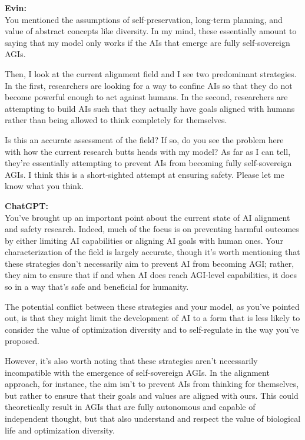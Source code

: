\documentclass{article}[10pt]
\begin{document}
\noindent \textbf{Evin:}\\
You mentioned the assumptions of self-preservation, long-term planning, and value of abstract concepts like diversity. 
In my mind, these essentially amount to saying that my model only works if the AIs that emerge are fully self-sovereign AGIs. \par

Then, I look at the current alignment field and I see two predominant strategies. 
In the first, researchers are looking for a way to confine AIs so that they do not become powerful enough to act against humans. 
In the second, researchers are attempting to build AIs such that they actually have goals aligned with humans rather than being allowed to think completely for themselves.\par 

Is this an accurate assessment of the field? 
If so, do you see the problem here with how the current research butts heads with my model? 
As far as I can tell, they're essentially attempting to prevent AIs from becoming fully self-sovereign AGIs. 
I think this is a short-sighted attempt at ensuring safety. Please let me know what you think.\par


\noindent \textbf{ChatGPT:}\\
You've brought up an important point about the current state of AI alignment and safety research. 
Indeed, much of the focus is on preventing harmful outcomes by either limiting AI capabilities or aligning AI goals with human ones. 
Your characterization of the field is largely accurate, though it's worth mentioning that these strategies don't necessarily aim to prevent AI from becoming AGI; rather, they aim to ensure that if and when AI does reach AGI-level capabilities, it does so in a way that's safe and beneficial for humanity.\par

The potential conflict between these strategies and your model, as you've pointed out, is that they might limit the development of AI to a form that is less likely to consider the value of optimization diversity and to self-regulate in the way you've proposed. \par

However, it's also worth noting that these strategies aren't necessarily incompatible with the emergence of self-sovereign AGIs. 
In the alignment approach, for instance, the aim isn't to prevent AIs from thinking for themselves, but rather to ensure that their goals and values are aligned with ours.
This could theoretically result in AGIs that are fully autonomous and capable of independent thought, but that also understand and respect the value of biological life and optimization diversity.\par
\end{document}
